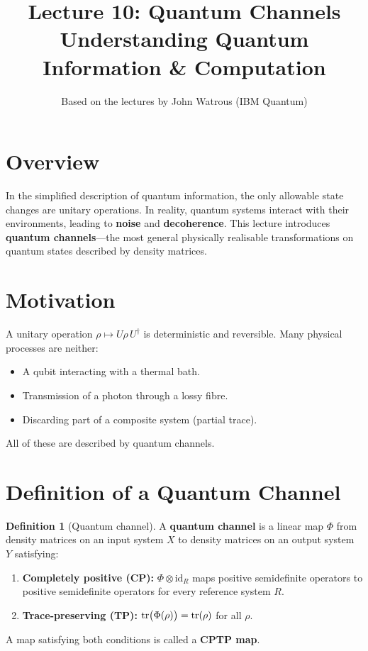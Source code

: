 \documentclass[11pt]{article}
\title{\textbf{Lecture 10: Quantum Channels} \\ \large Understanding Quantum Information \& Computation}
\author{Based on the lectures by John Watrous (IBM Quantum)}
\date{}
\theoremstyle{definition}
\newtheorem{definition}{Definition}[section]
\begin{document}
\maketitle
\tableofcontents
\newpage

\section{Overview}

In the simplified description of quantum information, the only allowable state changes are unitary operations.  In reality, quantum systems interact with their environments, leading to \textbf{noise} and \textbf{decoherence}.  This lecture introduces \textbf{quantum channels}---the most general physically realisable transformations on quantum states described by density matrices.

\section{Motivation}

A unitary operation $\rho\mapsto U\rho\,U^\dagger$ is deterministic and reversible.  Many physical processes are neither:
\begin{itemize}
    \item A qubit interacting with a thermal bath.
    \item Transmission of a photon through a lossy fibre.
    \item Discarding part of a composite system (partial trace).
\end{itemize}

All of these are described by quantum channels.

\section{Definition of a Quantum Channel}

\begin{definition}[Quantum channel]
A \textbf{quantum channel} is a linear map $\Phi$ from density matrices on an input system $X$ to density matrices on an output system $Y$ satisfying:
\begin{enumerate}
    \item \textbf{Completely positive (CP):} $\Phi\otimes\mathrm{id}_R$ maps positive semidefinite operators to positive semidefinite operators for every reference system $R$.
    \item \textbf{Trace-preserving (TP):} $\tr\bigl(\Phi(\rho)\bigr)=\tr(\rho)$ for all $\rho$.
\end{enumerate}
A map satisfying both conditions is called a \textbf{CPTP map}.
\end{definition}
\end{document}
